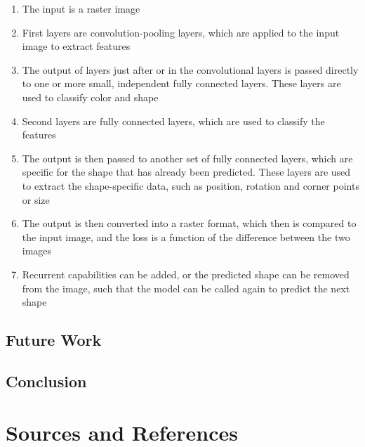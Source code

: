 \documentclass[12pt, a4paper, titlepage]{report}
\begin{document}
\begin{enumerate}
   \item The input is a raster image
   \item First layers are convolution-pooling layers, which are applied to the input image to extract features
   \item The output of layers just after or in the convolutional layers is passed directly to one or more small, independent fully connected layers. These layers are used to classify color and shape
   \item Second layers are fully connected layers, which are used to classify the features
   \item The output is then passed to another set of fully connected layers, which are specific for the shape that has already been predicted. These layers are used to extract the shape-specific data, such as position, rotation and corner points or size
   \item The output is then converted into a raster format, which then is compared to the input image, and the loss is a function of the difference between the two images

   \item Recurrent capabilities can be added, or the predicted shape can be removed from the image, such that the model can be called again to predict the next shape
\end{enumerate}

\section{Future Work}

\section{Conclusion}




\chapter{Sources and References}

\nocite{*}

\begin{refcontext}[labelprefix=T]
   \printbibliography[type=misc, keyword={TextResource}, title={Text Sources and References}]
\end{refcontext}
\end{document}
